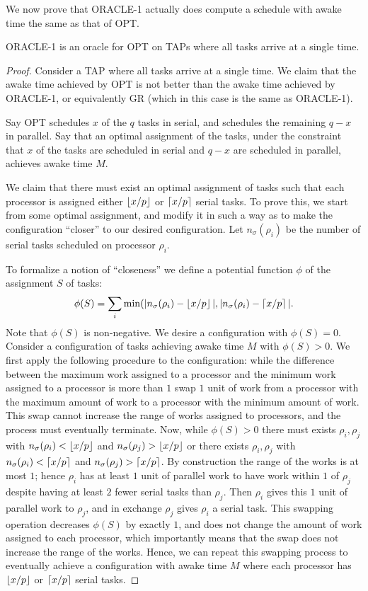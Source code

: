 We now prove that ORACLE-1 actually does compute a schedule with
awake time the same as that of OPT.
\begin{theorem}
  \label{thm:cakefrosting} 
  ORACLE-1 is an oracle for OPT on TAPs where all tasks arrive at a single time.
\end{theorem}
\begin{proof}
  Consider a TAP where all tasks arrive at a single time. We
  claim that the awake time achieved by OPT is not better than
  the awake time achieved by ORACLE-1, or equivalently GR (which
  in this case is the same as ORACLE-1).

  Say OPT schedules $x$ of the $q$ tasks in serial, and
  schedules the remaining $q-x$ in parallel.
  Say that an optimal assignment of the tasks, under the constraint
  that $x$ of the tasks are scheduled in serial and $q-x$ are
  scheduled in parallel, achieves awake time $M$.

  We claim that there must exist an optimal assignment of tasks
  such that each processor is assigned either $\left\lfloor x/p \right\rfloor$ or
  $\left\lceil x/p \right\rceil$ serial tasks. To prove this, we start from some
  optimal assignment, and modify it in such a way as to make the
  configuration \enquote{closer} to our desired configuration.
  Let $n_\sigma(\rho_i)$ be the number of serial tasks scheduled
  on processor $\rho_i$.

  To formalize a notion of \enquote{closeness} we define a
  potential function $\phi$ of the assignment $S$ of tasks:
  $$\phi(S) = \sum_{i} \min(|n_\sigma(\rho_i)-\left\lfloor x/p \right\rfloor|,
  |n_\sigma(\rho_i)-\left\lceil x/p \right\rceil|.$$ Note that $\phi(S)$ is
  non-negative. We desire a configuration with $\phi(S) = 0$.
  Consider a configuration of tasks achieving awake time $M$ with
  $\phi(S) > 0$. We first apply the following procedure to the
  configuration: while the difference between the maximum work
  assigned to a processor and the minimum work assigned to a
  processor is more than $1$ swap $1$ unit of work from a
  processor with the maximum amount of work to a processor with
  the minimum amount of work. This swap cannot increase the range
  of works assigned to processors, and the process must
  eventually terminate. Now, while $\phi(S) > 0$ there must
  exists $\rho_i, \rho_j$ with $n_\sigma(\rho_i) < \left\lfloor x/p \right\rfloor$
  and $n_\sigma(\rho_j) > \left\lfloor x/p \right\rfloor$ or there exists $\rho_i,
  \rho_j$ with $n_\sigma(\rho_i) < \left\lceil x/p \right\rceil$ and
  $n_\sigma(\rho_j) > \left\lceil x/p \right\rceil$. By construction the range of
  the works is at most $1$; hence $\rho_i$ has at least $1$ unit
  of parallel work to have work within $1$ of $\rho_j$ despite
  having at least $2$ fewer serial tasks than $\rho_j$. Then
  $\rho_i$ gives this $1$ unit of parallel work to $\rho_j$, and
  in exchange $\rho_j$ gives $\rho_i$ a serial task. This
  swapping operation decreases $\phi(S)$ by exactly $1$, and does
  not change the amount of work assigned to each processor, which
  importantly means that the swap does not increase the range of
  the works. Hence, we can repeat this swapping process to
  eventually achieve a configuration with awake time $M$ where
  each processor has $\left\lfloor x/p \right\rfloor$ or $\left\lceil x/p \right\rceil$ serial tasks.


\end{proof}
